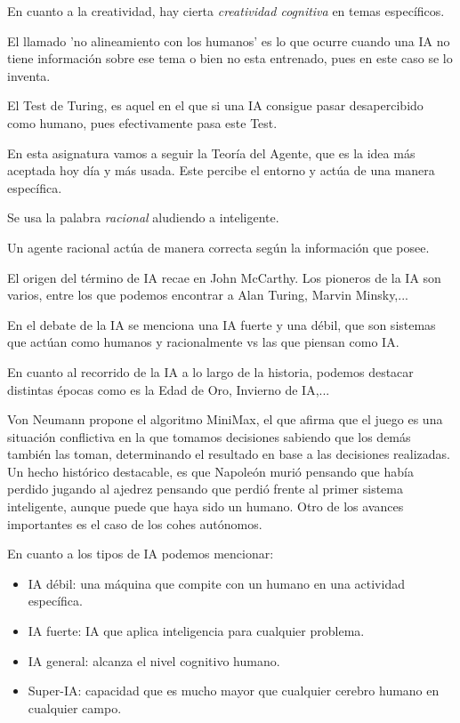 En cuanto a la creatividad, hay cierta\textit{ creatividad cognitiva }en temas específicos.

El llamado 'no alineamiento con los humanos' es lo que ocurre cuando una IA no tiene información sobre ese tema o bien no esta entrenado, pues en este caso se lo inventa.

El Test de Turing, es aquel en el que si una IA consigue pasar desapercibido como humano, pues efectivamente pasa este Test.

En esta asignatura vamos a seguir la Teoría del Agente, que es la idea más aceptada hoy día y más usada. Este percibe el entorno y actúa de una manera específica. 

Se usa la palabra \textit{racional} aludiendo a inteligente.

Un agente racional actúa de manera correcta según la información que posee.

El origen del término de IA recae en John McCarthy. Los pioneros de la IA son varios, entre los que podemos encontrar a Alan Turing, Marvin Minsky,...

En el debate de la IA se menciona una IA fuerte y una débil, que son sistemas que actúan como humanos y racionalmente vs las que piensan como IA.

En cuanto al recorrido de la IA a lo largo de la historia, podemos destacar distintas épocas como es la Edad de Oro, Invierno de IA,...

Von Neumann propone el algoritmo MiniMax, el que afirma que el juego es una situación conflictiva en la que tomamos decisiones sabiendo que los demás también las toman, determinando el resultado en base a las decisiones realizadas.
Un hecho histórico destacable, es que Napoleón murió pensando que había perdido jugando al ajedrez pensando que perdió frente al primer sistema inteligente, aunque puede que haya sido un humano. 
Otro de los avances importantes es el caso de los cohes autónomos.

En cuanto a los tipos de IA podemos mencionar:

\begin{itemize}
    \item IA débil: una máquina que compite con un humano en una actividad específica.
    \item IA fuerte: IA que aplica inteligencia para cualquier problema.
    \item IA general: alcanza el nivel cognitivo humano.
    \item Super-IA: capacidad que es mucho mayor que cualquier cerebro humano en cualquier campo.
\end{itemize}
